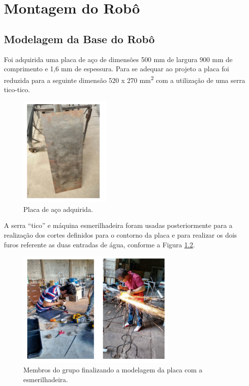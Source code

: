 \chapter{Montagem do Robô} \label{ch:mount-robot}
\section{Modelagem da Base do Robô}
Foi adquirida uma placa de aço de dimensões 500 mm de largura 900 mm de comprimento e 1,6 mm de espessura. Para se adequar ao projeto a placa foi reduzida para a seguinte dimensão 520 x 270 mm\textsuperscript{2} com a utilização de uma serra  tico-tico.

\par
\begin{figure}[h]
  \centering
  \includegraphics[width=0.4\textwidth]{figures/placa.png}
  \caption{Placa de aço adquirida.}
  \label{fig:placa}
\end{figure}
\FloatBarrier
\par

A serra “tico” e máquina esmerilhadeira foram usadas posteriormente para a realização dos cortes definidos para o contorno da placa e para realizar os dois furos referente as duas entradas de água, conforme a Figura \ref{fig:workers}.

\par
\begin{figure}[h]
  \centering
  \includegraphics[width=0.7\textwidth]{figures/workers.png}
  \caption{Membros do grupo finalizando a modelagem da placa com a esmerilhadeira.}
  \label{fig:workers}
\end{figure}
\FloatBarrier
\par

